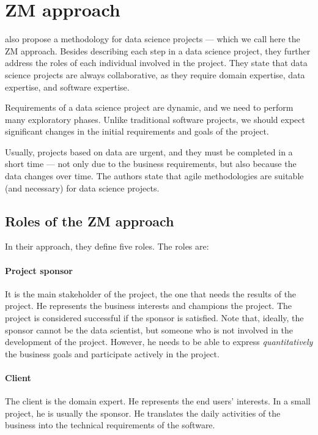 \section{ZM approach}

\textcite{Zumel2019} also propose a methodology for data science projects --- which we
call here the ZM approach.  Besides
describing each step in a data science project, they further address the roles of each
individual involved in the project.  They state that data science projects are always
collaborative, as they require domain expertise, data expertise, and software expertise.

Requirements of a data science project are dynamic, and we need to perform many
exploratory phases.  Unlike traditional software projects, we should expect significant
changes in the initial requirements and goals of the project.

Usually,
projects based on data are urgent, and they must be completed in a short time --- not
only due to the business requirements, but also because the data changes over time.
The authors state that agile methodologies are suitable (and necessary) for data science
projects.

\subsection{Roles of the ZM approach}

In their approach, they define five roles.  The roles are:

\paragraph{Project sponsor}  It is the main stakeholder of the project, the one that needs the
results of the project.  He represents the business interests and champions the project.
The project is considered successful if the sponsor is satisfied.  Note that, ideally, the
sponsor cannot be the data scientist, but someone who is not involved in the development
of the project.  However, he needs to be able to express \emph{quantitatively} the business
goals and participate actively in the project.

\paragraph{Client}  The client is the domain expert.  He represents the end users'
interests.  In a small project, he is usually the sponsor.  He translates the daily
activities of the business into the technical requirements of the software.

